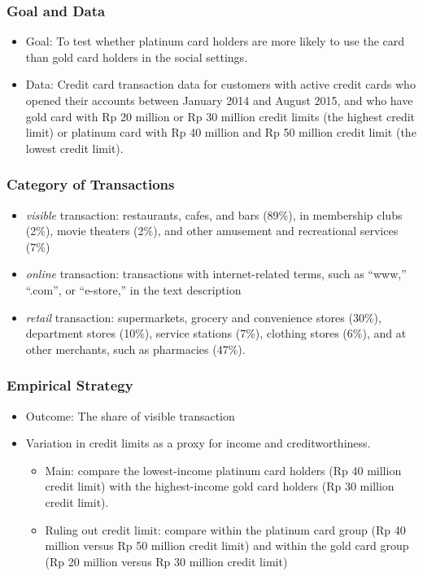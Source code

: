\documentclass[unicode,12pt]{beamer}
\begin{document}
    \begin{frame}
        \frametitle{Goal and Data}
    
        \begin{itemize}
            \item Goal: To test whether platinum card holders are more likely to use the card than gold card holders in the social settings.
            \item Data: Credit card transaction data for customers with active credit cards who opened their accounts between January 2014 and August 2015, and who have gold card with Rp 20 million or Rp 30 million credit limits (the highest credit limit) or platinum card with Rp 40 million and Rp 50 million credit limit (the lowest credit limit).            
        \end{itemize}
    
    \end{frame}

    \begin{frame}
        \frametitle{Category of Transactions}
    
        \begin{itemize}
            \item \textit{visible} transaction: restaurants, cafes, and bars (89\%), in membership clubs (2\%), movie theaters (2\%), and other amusement and recreational services (7\%)
            \item \textit{online} transaction: transactions with internet-related terms, such as ``www,'' ``.com'', or ``e-store,'' in the text description
            \item \textit{retail} transaction: supermarkets, grocery and convenience stores (30\%), department stores (10\%), service stations (7\%), clothing stores (6\%), and at other merchants, such as pharmacies (47\%).
        \end{itemize}
    
    \end{frame}

    \begin{frame}
        \frametitle{Empirical Strategy}
    
        \begin{itemize}      
            \item Outcome: The share of visible transaction    
            \item Variation in credit limits as a proxy for income and creditworthiness.
            \begin{itemize}
                \item Main: compare the lowest-income platinum card holders (Rp 40 million credit limit) with the highest-income gold card holders (Rp 30 million credit limit).
                \item Ruling out credit limit: compare within the platinum card group (Rp 40 million versus Rp 50 million credit limit) and within the gold card group (Rp 20 million versus Rp 30 million credit limit)
            \end{itemize}
        \end{itemize}
    
    \end{frame}
\end{document}
